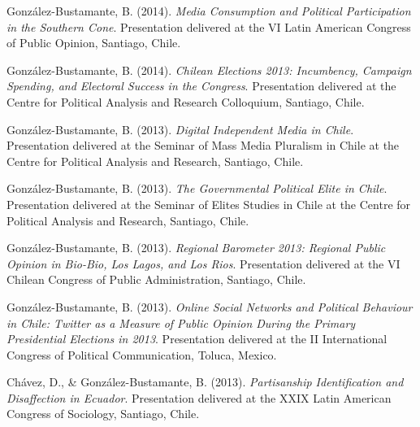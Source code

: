 \begin{publications}
\begin{benumerate}{66}
\item{\small González-Bustamante, B. (2014). {\itshape Media Consumption and Political Participation in the Southern Cone}. Presentation delivered at the VI Latin American Congress of Public Opinion, Santiago, Chile.}\vspace{1mm}

\item{\small González-Bustamante, B. (2014). {\itshape Chilean Elections 2013: Incumbency, Campaign Spending, and Electoral Success in the Congress}. Presentation delivered at the Centre for Political Analysis and Research Colloquium, Santiago, Chile.}\vspace{1mm}

\item{\small González-Bustamante, B. (2013). {\itshape Digital Independent Media in Chile}. Presentation delivered at the Seminar of Mass Media Pluralism in Chile at the Centre for Political Analysis and Research, Santiago, Chile.}\vspace{1mm}

\item{\small González-Bustamante, B. (2013). {\itshape The Governmental Political Elite in Chile}. Presentation delivered at the Seminar of Elites Studies in Chile at the Centre for Political Analysis and Research, Santiago, Chile.}\vspace{1mm}

\item{\small González-Bustamante, B. (2013). {\itshape Regional Barometer 2013: Regional Public Opinion in Bio-Bio, Los Lagos, and Los Rios}. Presentation delivered at the VI Chilean Congress of Public Administration, Santiago, Chile.}\vspace{1mm}

\item{\small González-Bustamante, B. (2013). {\itshape Online Social Networks and Political Behaviour in Chile: Twitter as a Measure of Public Opinion During the Primary Presidential Elections in 2013}. Presentation delivered at the II International Congress of Political Communication, Toluca, Mexico.}\vspace{1mm}

\item{\small Chávez, D., \& González-Bustamante, B. (2013). {\itshape Partisanship Identification and Disaffection in Ecuador}. Presentation delivered at the XXIX Latin American Congress of Sociology, Santiago, Chile.}\vspace{1mm}


\end{benumerate}
\end{publications}
